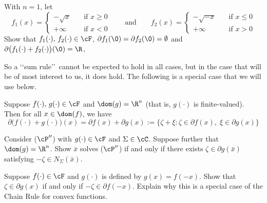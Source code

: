 \documentclass[12pt]{article}
\begin{document}
{\blue
\begin{exer}
With $n=1$, let 
\[
f_1(x)=
\begin{cases}
-\sqrt{x}\quad &\text{if  }x\geq 0 \\
+\infty &\text{if  }x< 0
\end{cases}\qquad\text{and}\qquad
f_2(x)=
\begin{cases}
-\sqrt{-x}\quad &\text{if  }x\leq 0 \\
+\infty &\text{if  }x> 0
\end{cases}
\]
Show that $f_1(\cdot),\,f_2(\cdot)\in\cF$, $\partial f_1(\0)=\partial f_2(\0)=\emptyset$ and $\partial \bigl(f_1(\cdot)+f_2(\cdot)\bigr)(\0)=\R$,  
\end{exer}}

So a \lq\lq sum rule\rq\rq\ cannot be expected to hold in all cases, but in the case that will be of most interest to us, it does hold.  The following is a special case that we will use below.
 
\begin{thm}\label{thm: sum}
Suppose $f(\cdot),\,g(\cdot)\in\cF$ and $\dom(g)=\R^n$ (that is, $g(\cdot)$ is finite-valued).  Then for all $x\in\dom(f)$, we have
\[
\partial \biggl(f(\cdot)+g(\cdot)\biggr)(x)=\partial f(x) +\partial g(x):=\bigl\{\zeta+\xi:\zeta\in\partial f(x),\;\xi\in\partial g(x)\bigr\}
\]
\end{thm} 

{\blue
\begin{exer}
Consider ($\cP''$) with $g(\cdot)\in\cF$ and $\Sigma\in\cC$.  Suppose further that $\dom(g)=\R^n$.  Show $\bar x$ solves ($\cP''$) if and only if there exists $\zeta\in \partial g(\bar x)$ satisfying $-\zeta\in N_{\Sigma}(\bar x)$.  
\end{exer}

\begin{exer}
Suppose $f(\cdot)\in\cF$ and $g(\cdot)$ is defined by $g(x)=f(-x)$.  Show that $\zeta\in\partial g(x)$ if and only if $-\zeta\in \partial f(-x)$.  Explain why this is a special case of the Chain Rule for convex functions.
\end{exer}
}
\end{document}
